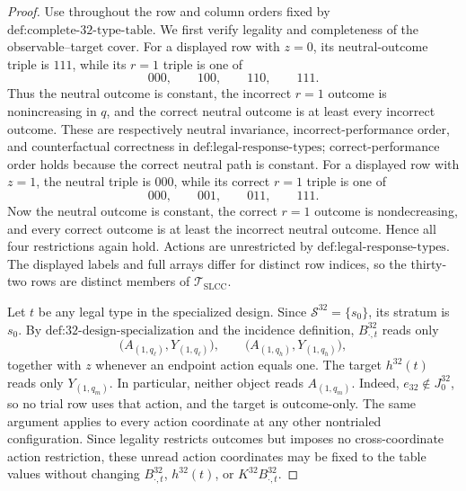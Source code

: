 \documentclass{article}
\begin{document}
\begin{proof}
Use throughout the row and column orders fixed by \(\text{def:complete-32-type-table}\).  We first verify legality and completeness of the observable--target cover.  For a displayed row with \(z=0\), its neutral-outcome triple is \(111\), while its \(r=1\) triple is one of
\[
000,\qquad 100,\qquad 110,\qquad 111.
\tag{1}
\]
Thus the neutral outcome is constant, the incorrect \(r=1\) outcome is nonincreasing in \(q\), and the correct neutral outcome is at least every incorrect outcome.  These are respectively neutral invariance, incorrect-performance order, and counterfactual correctness in \(\text{def:legal-response-types}\); correct-performance order holds because the correct neutral path is constant.  For a displayed row with \(z=1\), the neutral triple is \(000\), while its correct \(r=1\) triple is one of
\[
000,\qquad 001,\qquad 011,\qquad 111.
\tag{2}
\]
Now the neutral outcome is constant, the correct \(r=1\) outcome is nondecreasing, and every correct outcome is at least the incorrect neutral outcome.  Hence all four restrictions again hold.  Actions are unrestricted by \(\text{def:legal-response-types}\).  The displayed labels and full arrays differ for distinct row indices, so the thirty-two rows are distinct members of \(\mathcal T_{\mathrm{SLCC}}\).

Let \(t\) be any legal type in the specialized design.  Since \(\mathcal S^{32}=\{s_0\}\), its stratum is \(s_0\).  By \(\text{def:32-design-specialization}\) and the incidence definition, \(B^{32}_{\cdot,t}\) reads only
\[
\bigl(A_{(1,q_\ell)},Y_{(1,q_\ell)}\bigr),
\qquad
\bigl(A_{(1,q_h)},Y_{(1,q_h)}\bigr),
\tag{3}
\]
together with \(z\) whenever an endpoint action equals one.  The target \(h^{32}(t)\) reads only \(Y_{(1,q_m)}\).  In particular, neither object reads \(A_{(1,q_m)}\).  Indeed, \(e_{32}\notin J^{32}_0\), so no trial row uses that action, and the target is outcome-only.  The same argument applies to every action coordinate at any other nontrialed configuration.  Since legality restricts outcomes but imposes no cross-coordinate action restriction, these unread action coordinates may be fixed to the table values without changing \(B^{32}_{\cdot,t}\), \(h^{32}(t)\), or \(K^{32}B^{32}_{\cdot,t}\).


\end{proof}
\end{document}
